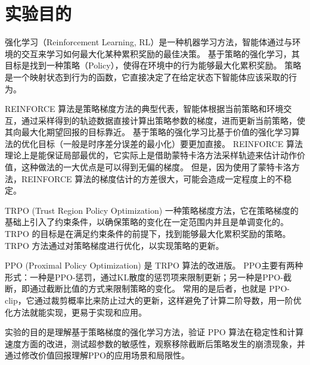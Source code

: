 \section{实验目的}

强化学习（Reinforcement Learning, RL）是一种机器学习方法，智能体通过与环境的交互来学习如何最大化某种累积奖励的最佳决策。
基于策略的强化学习，其目标是找到一种策略（Policy），使得在环境中的行为能够最大化累积奖励。
策略是一个映射状态到行为的函数，它直接决定了在给定状态下智能体应该采取的行为。


REINFORCE 算法是策略梯度方法的典型代表，智能体根据当前策略和环境交互，通过采样得到的轨迹数据直接计算出策略参数的梯度，进而更新当前策略，使其向最大化期望回报的目标靠近。
基于策略的强化学习比基于价值的强化学习算法的优化目标（一般是时序差分误差的最小化）要更加直接。
REINFORCE 算法理论上是能保证局部最优的，它实际上是借助蒙特卡洛方法采样轨迹来估计动作价值，这种做法的一大优点是可以得到无偏的梯度。
但是，因为使用了蒙特卡洛方法，REINFORCE 算法的梯度估计的方差很大，可能会造成一定程度上的不稳定。


TRPO (Trust Region Policy Optimization) 一种策略梯度方法，它在策略梯度的基础上引入了约束条件，以确保策略的变化在一定范围内并且是单调变化的。
TRPO 的目标是在满足约束条件的前提下，找到能够最大化累积奖励的策略。TRPO 方法通过对策略梯度进行优化，以实现策略的更新。


PPO (Proximal Policy Optimization) 是 TRPO 算法的改进版。
PPO主要有两种形式：一种是PPO-惩罚，通过KL散度的惩罚项来限制更新；另一种是PPO-截断，即通过截断比值的方式来限制策略的变化。
常用的是后者，也就是 PPO-clip，它通过裁剪概率比来防止过大的更新，这样避免了计算二阶导数，用一阶优化方法就能实现，更易于实现和应用。

实验的目的是理解基于策略梯度的强化学习方法，验证 PPO 算法在稳定性和计算速度方面的改进，测试超参数的敏感性，观察移除截断后策略发生的崩溃现象，并通过修改价值回报理解PPO的应用场景和局限性。